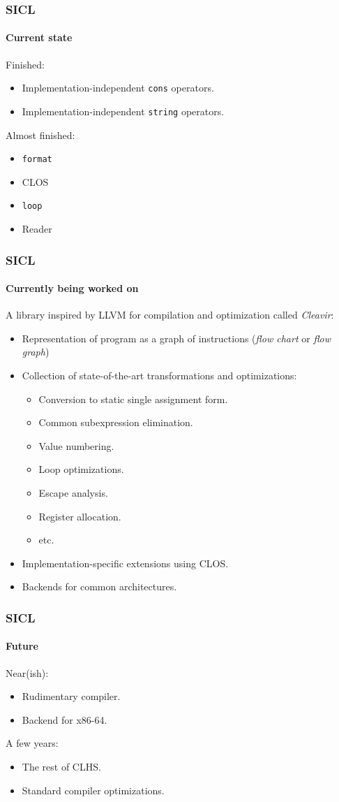 \documentclass{beamer}
\begin{document}
\begin{frame}
  \frametitle{SICL}
  \framesubtitle{Current state}
Finished:
\vskip 0.25cm
\begin{itemize}
\item Implementation-independent \texttt{cons} operators. 
\item Implementation-independent \texttt{string} operators.
\end{itemize}
\vskip 0.5cm
Almost finished:
\vskip 0.25cm
\begin{itemize}
\item \texttt{format}
\item CLOS
\item \texttt{loop}
\item Reader
\end{itemize}

\end{frame}
\begin{frame}
  \frametitle{SICL}
  \framesubtitle{Currently being worked on}

A library inspired by LLVM for compilation and optimization called
\emph{Cleavir}: 

\begin{itemize}
\item Representation of program as a graph of instructions (\emph{flow
  chart} or \emph{flow graph})
\item Collection of state-of-the-art transformations and
  optimizations:
  \begin{itemize}
  \item Conversion to static single assignment form.
  \item Common subexpression elimination.
  \item Value numbering.
  \item Loop optimizations.
  \item Escape analysis.
  \item Register allocation.
  \item etc.
  \end{itemize}
\item Implementation-specific extensions using CLOS.
\item Backends for common architectures.
\end{itemize}

\end{frame}
\begin{frame}
  \frametitle{SICL}
  \framesubtitle{Future}

Near(ish):
\begin{itemize}
\item Rudimentary compiler.
\item Backend for x86-64.
\end{itemize}
\vskip 0.5cm
  
A few years:
\begin{itemize}
\item The rest of CLHS.
\item Standard compiler optimizations.
\end{itemize}

\end{frame}
\end{document}

